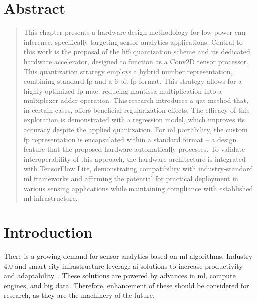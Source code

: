 
\section*{Abstract}
\begin{quote}
This chapter presents a hardware design methodology for low-power \gls{cnn} inference, specifically targeting sensor analytics applications. Central to this work is the proposal of the \gls{hf6} quantization scheme and its dedicated hardware accelerator, designed to function as a Conv2D tensor processor. This quantization strategy employs a hybrid number representation, combining standard \gls{fp} and a 6-bit \gls{fp} format. This strategy allows for a highly optimized \gls{fp} \gls{mac}, reducing mantissa multiplication into a multiplexer-adder operation. This research introduces a \gls{qat} method that, in certain cases, offers beneficial regularization effects. The efficacy of this exploration is demonstrated with a regression model, which improves its accuracy despite the applied quantization. For \gls{ml} portability, the custom \gls{fp} representation is encapsulated within a standard format -- a design feature that the proposed hardware automatically processes. To validate interoperability of this approach, the hardware architecture is integrated with TensorFlow Lite, demonstrating compatibility with industry-standard \gls{ml} frameworks and affirming the potential for practical deployment in various sensing applications while maintaining compliance with established \gls{ml} infrastructure.

\end{quote}

\section{Introduction}
\label{sec:introduction}
There is a growing demand for sensor analytics based on \gls{ml} algorithms. Industry 4.0 and smart city infrastructure leverage \gls{ai} solutions to increase productivity and adaptability~\cite{lom2016industry}. These solutions are powered by advances in \gls{ml}, compute engines, and big data. Therefore, enhancement of these should be considered for research, as they are the machinery of the future.

